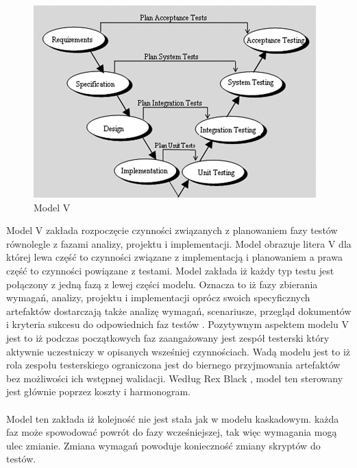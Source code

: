 \begin{figure}[h]
\centerline{\includegraphics[scale=0.5]{img/vmodel.png}}
\caption{Model V \cite{otss}}
\label{fig:vmodel}
\end{figure}
Model V zakłada rozpoczęcie czynności związanych z planowaniem fazy testów równolegle z fazami analizy, projektu i implementacji. Model obrazuje litera V dla której lewa część to czynności związane z implementacją i planowaniem a prawa część to czynności powiązane z testami. Model zakłada iż każdy typ testu jest połączony z jedną fazą z lewej części modelu. Oznacza to iż fazy zbierania wymagań, analizy, projektu i implementacji oprócz swoich specyficznych artefaktów dostarczają także analizę wymagań, scenariusze, przegląd dokumentów i kryteria sukcesu do odpowiednich faz testów \cite{otss}.
Pozytywnym aspektem modelu V jest to iż podczas początkowych faz zaangażowany jest zespół testerski który aktywnie uczestniczy w opisanych wsześniej czynnościach. Wadą modelu jest to iż rola zespołu testerskiego ograniczona jest do biernego przyjmowania artefaktów bez możliwości ich wstępnej walidacji.  Według Rex Black \cite{Fund}, model ten sterowany jest głównie poprzez koszty i harmonogram.
\paragraph{}
Model ten zakłada iż kolejność nie jest stała jak w modelu kaskadowym. każda  faz może spowodować powrót do fazy wcześniejszej, tak więc wymagania mogą ulec zmianie. Zmiana wymagań powoduje konieczność zmiany skryptów do testów.

